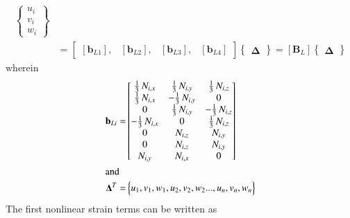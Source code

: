 \begin{equation}
\begin{aligned}
\begin{Bmatrix}
u_{i} \\
v_{i} \\
w_{i} \end{Bmatrix} \\
& = \begin{bmatrix}
[\mathbf{b}_{L1}], & [\mathbf{b}_{L2}], & [\mathbf{b}_{L3}], & [\mathbf{b}_{L4}]
\end{bmatrix}  \begin{Bmatrix} \boldsymbol{\Delta} \end{Bmatrix}  
= [\mathbf{B}_L] \begin{Bmatrix} \boldsymbol{\Delta} \end{Bmatrix} 
\end{aligned}
\end{equation}
wherein 
\begin{subequations}
	\begin{align}
	\mathbf{b}_{Li} = & \begin{bmatrix}
	\tfrac{1}{3} \,  N_{i,x}  & \tfrac{1}{3} \,  N_{i,y} & \tfrac{1}{3} \,  N_{i,z} \\
	\tfrac{1}{3} \,  N_{i,x}  & -\tfrac{1}{3} \,  N_{i,y} & 0 \\ 0 & \tfrac{1}{3} \, N_{i,y}  & - \tfrac{1}{3} \,  N_{i,z} \\ - \tfrac{1}{3} \,  N_{i,x}  & 0 & \tfrac{1}{3} \,  N_{i,z} \\ 0 &  N_{i,z}  &  N_{i,y} \\ 0 & N_{i,z}  &   N_{i,y} \\  N_{i,y}  &   N_{i,x} & 0 \end{bmatrix}  \\
	\intertext{and}
	\mathbf{\Delta}^T  = &
	\begin{Bmatrix}
	u_1, v_1, w_1, u_2, v_2, w_2 ...,u_n, v_n, w_n
	\end{Bmatrix}
	\end{align}
\end{subequations}
The first nonlinear strain terms can be written as 
